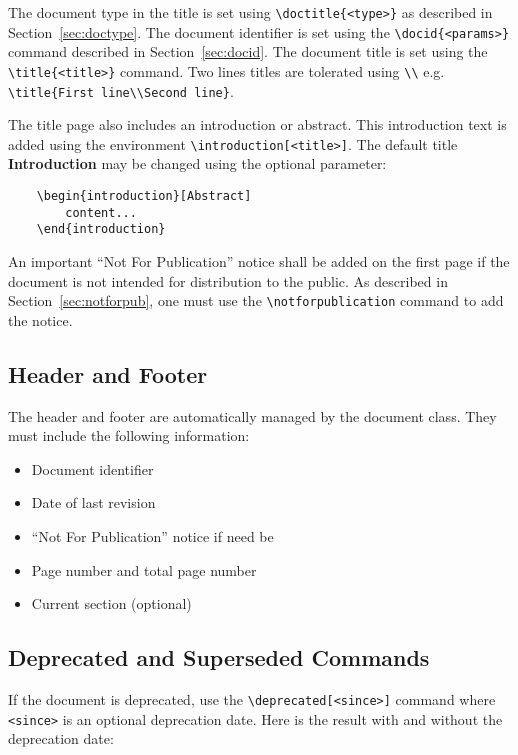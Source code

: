 \documentclass[technicalreport]{coilchain}
\begin{document}
The document type in the title is set using  \verb|\doctitle{<type>}| as 
described in Section~\ref{sec:doctype}. The document identifier is set using 
the \verb|\docid{<params>}| command described in Section~\ref{sec:docid}. The 
document title is set using the \verb|\title{<title>}| command. Two lines 
titles are tolerated using \texttt{\textbackslash\textbackslash} e.g.
\texttt{\textbackslash{}title\{First line\textbackslash\textbackslash{}Second 
line\}}.

The title page also includes an introduction or abstract. This introduction 
text is added using the environment \verb|\introduction[<title>]|. The default 
title \textbf{Introduction} may be changed using the optional parameter:
\begin{verbatim}
    \begin{introduction}[Abstract]
        content...
    \end{introduction}
\end{verbatim}

An important ``Not For Publication'' notice shall be added on the first page if 
the document is not intended for distribution to the public. As described in 
Section~\ref{sec:notforpub}, one must use the \verb|\notforpublication| command 
to add the notice.

\subsection{Header and Footer}
The header and footer are automatically managed by the document class. They 
must include the following information:
\begin{itemize}
	\item Document identifier
	\item Date of last revision
	\item ``Not For Publication'' notice if need be
	\item Page number and total page number
	\item Current section (optional)
\end{itemize}

\subsection{Deprecated and Superseded Commands}
If the document is deprecated, use the \verb|\deprecated[<since>]| command 
where \verb|<since>| is an optional deprecation date. Here is the result with 
and without the deprecation date:
\end{document}
